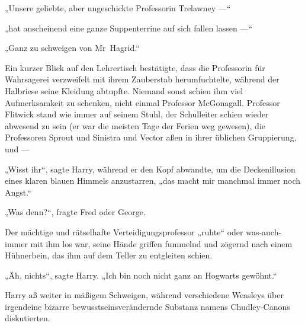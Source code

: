 „Unsere geliebte, aber ungeschickte Professorin Trelawney —“

„hat anscheinend eine ganze Suppenterrine auf sich fallen lassen —“

„Ganz zu schweigen von Mr~Hagrid.“

Ein kurzer Blick auf den Lehrertisch bestätigte, dass die Professorin für Wahrsagerei verzweifelt mit ihrem Zauberstab herumfuchtelte, während der Halbriese seine Kleidung abtupfte. Niemand sonst schien ihm viel Aufmerksamkeit zu schenken, nicht einmal Professor McGonagall. Professor Flitwick stand wie immer auf seinem Stuhl, der Schulleiter schien wieder abwesend zu sein (er war die meisten Tage der Ferien weg gewesen), die Professoren Sprout und Sinistra und Vector aßen in ihrer üblichen Gruppierung, und —

„Wisst ihr“, sagte Harry, während er den Kopf abwandte, um die Deckenillusion eines klaren blauen Himmels anzustarren, „das macht mir manchmal immer noch Angst.“

„Was denn?“, fragte Fred oder George.

Der mächtige und rätselhafte Verteidigungsprofessor „ruhte“ oder was-auch-immer mit ihm los war, seine Hände griffen fummelnd und zögernd nach einem Hühnerbein, das ihm auf dem Teller zu entgleiten schien.

„Äh, nichts“, sagte Harry.
„Ich bin noch nicht ganz an Hogwarts gewöhnt.“

Harry aß weiter in mäßigem Schweigen, während verschiedene Weasleys über irgendeine bizarre bewusstseinsverändernde Substanz namens Chudley-Canons diskutierten.


